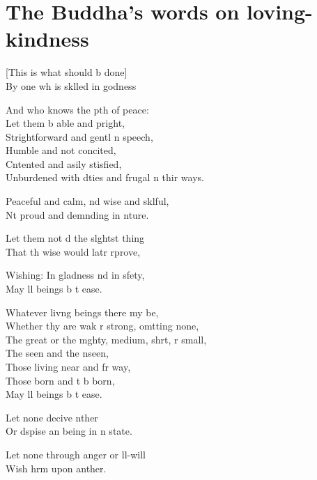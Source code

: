 \chapter[Loving-kindness]{The Buddha's words on loving-kindness}

\begin{leader}
\end{leader}

[This is what should b done]\\
By one wh is sklled in godness

And who knows the pth of peace:\\
Let them b able and pright,\\
Strightforward and gentl n speech,\\
Humble and not concited,\\
Cntented and asily stisfied,\\
Unburdened with dties and frugal n thir ways.

Peaceful and calm, nd wise and sklful,\\
Nt proud and demnding in nture.

Let them not d the slghtst thing\\
That th wise would latr rprove,

Wishing: In gladness nd in sfety,\\
May ll beings b t ease.

Whatever livng beings there my be,\\
Whether thy are wak r strong, omtting none,\\
The great or the mghty, medium, shrt, r small,\\
The seen and the nseen,\\
Those living near and fr way,\\
Those born and t b born,\\
May ll beings b t ease.

Let none decive nther\\
Or dspise an being in n state.

Let none through anger or ll-will\\
Wish hrm upon anther.


